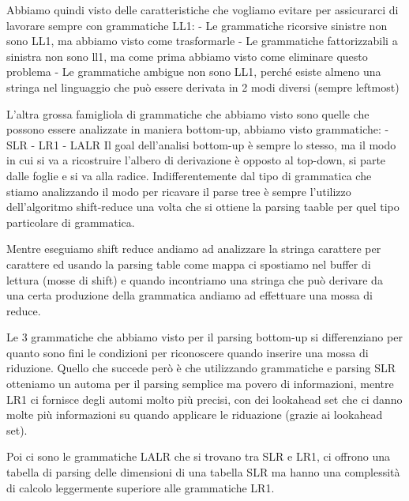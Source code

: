 \documentclass[class=book, crop=false, oneside, 12pt]{standalone}
\begin{document}
Abbiamo quindi visto delle caratteristiche che vogliamo evitare per assicurarci di lavorare sempre con grammatiche LL1:
	- Le grammatiche ricorsive sinistre non sono LL1, ma abbiamo visto come trasformarle
	- Le grammatiche fattorizzabili a sinistra non sono ll1, ma come prima abbiamo visto come eliminare questo problema
	- Le grammatiche ambigue non sono LL1, perché esiste almeno una stringa nel linguaggio che può essere derivata in 2 modi diversi (sempre leftmost)

L'altra grossa famigliola di grammatiche che abbiamo visto sono quelle che possono essere analizzate in maniera bottom-up, abbiamo visto grammatiche:
	- SLR
	- LR1
	- LALR
Il goal dell'analisi bottom-up è sempre lo stesso, ma il modo in cui si va a ricostruire l'albero di derivazione è opposto al top-down, si parte dalle foglie e si va alla radice.
Indifferentemente dal tipo di grammatica che stiamo analizzando il modo per ricavare il parse tree è sempre l'utilizzo dell'algoritmo shift-reduce una volta che si ottiene la parsing taable per quel tipo particolare di grammatica.

Mentre eseguiamo shift reduce andiamo ad analizzare la stringa carattere per carattere ed usando la parsing table come mappa ci spostiamo nel buffer di lettura (mosse di shift) e quando incontriamo una stringa che può derivare da una certa produzione della grammatica andiamo ad effettuare una mossa di reduce.

Le 3 grammatiche che abbiamo visto per il parsing bottom-up si differenziano per quanto sono fini le condizioni per riconoscere quando inserire una mossa di riduzione.
Quello che succede però è che utilizzando grammatiche e parsing SLR otteniamo un automa per il parsing semplice ma povero di informazioni, mentre LR1 ci fornisce degli automi molto più precisi, con dei lookahead set che ci danno molte più informazioni su quando applicare le riduazione (grazie ai lookahead set).

Poi ci sono le grammatiche LALR che si trovano tra SLR e LR1, ci offrono una tabella di parsing delle dimensioni di una tabella SLR ma hanno una complessità di calcolo leggermente superiore alle grammatiche LR1.
\end{document}
